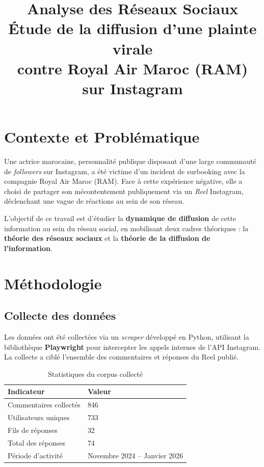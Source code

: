 \documentclass[12pt, a4paper]{article}
\title{
    \vspace{-1cm}
    \textbf{Analyse des Réseaux Sociaux} \\[0.4em]
    \large Étude de la diffusion d'une plainte virale \\
    contre Royal Air Maroc (RAM) sur Instagram
}
\author{}
\date{}
\begin{document}
\maketitle
\thispagestyle{fancy}

\section{Contexte et Problématique}

Une actrice marocaine, personnalité publique disposant d'une large communauté de
\textit{followers} sur Instagram, a été victime d'un incident de surbooking avec la
compagnie Royal Air Maroc (RAM). Face à cette expérience négative, elle a choisi de
partager son mécontentement publiquement via un \textit{Reel} Instagram, déclenchant
une vague de réactions au sein de son réseau.

L'objectif de ce travail est d'étudier la \textbf{dynamique de diffusion} de cette
information au sein du réseau social, en mobilisant deux cadres théoriques :
la \textbf{théorie des réseaux sociaux} et la \textbf{théorie de la diffusion de
l'information}.

\section{Méthodologie}

\subsection{Collecte des données}

Les données ont été collectées via un \textit{scraper} développé en Python, utilisant la
bibliothèque \textbf{Playwright} pour intercepter les appels internes de l'API Instagram.
La collecte a ciblé l'ensemble des commentaires et réponses du Reel publié.

\begin{table}[h!]
\centering
\begin{tabular}{@{}ll@{}}
\toprule
\textbf{Indicateur} & \textbf{Valeur} \\
\midrule
Commentaires collectés  & 846 \\
Utilisateurs uniques    & 733 \\
Fils de réponses        & 32 \\
Total des réponses      & 74 \\
Période d'activité      & Novembre 2024 -- Janvier 2026 \\
\bottomrule
\end{tabular}
\caption{Statistiques du corpus collecté}
\end{table}
\end{document}
